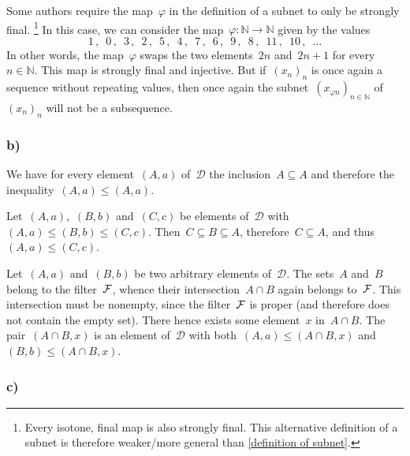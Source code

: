 \begin{itemize*}[resume*]

	\item
		Some authors require the map~$φ$ in the definition of a subnet to only be strongly final.%
		\footnote{
			Every isotone, final map is also strongly final.
			This alternative definition of a subnet is therefore weaker/more general than \cref{definition of subnet}.
		}
		In this case, we can consider the map~$φ \colon ℕ \to ℕ$ given by the values
		\[
			1 \,, \enspace 0 \,, \enspace
			3 \,, \enspace 2 \,, \enspace
			5 \,, \enspace 4 \,, \enspace
			7 \,, \enspace 6 \,, \enspace
			9 \,, \enspace 8 \,, \enspace
			11 \,, \enspace 10 \,, \enspace
			\dotsc
		\]
		In other words, the map~$φ$ swaps the two elements~$2n$ and~$2n + 1$ for every~$n ∈ ℕ$.
		This map is strongly final and injective.
		But if~$(x_n)_n$ is once again a sequence without repeating values, then once again the subnet~$(x_{φ n})_{n ∈ ℕ}$ of~$(x_n)_n$ will not be a subsequence.

\end{itemize*}



\subsubsection{b)}

We have for every element~$(A, a)$ of~$\mathcal{D}$ the inclusion~$A ⊆ A$ and therefore the inequality~$(A, a) ≤ (A, a)$.

Let~$(A, a)$,~$(B, b)$ and~$(C, c)$ be elements of~$\mathcal{D}$ with~$(A, a) ≤ (B, b) ≤ (C, c)$.
Then~$C ⊆ B ⊆ A$, therefore~$C ⊆ A$, and thus~$(A, a) ≤ (C, c)$.

Let~$(A, a)$ and~$(B, b)$ be two arbitrary elements of~$\mathcal{D}$.
The sets~$A$ and~$B$ belong to the filter~$\mathcal{F}$, whence their intersection~$A ∩ B$ again belongs to~$\mathcal{F}$.
This intersection must be nonempty, since the filter~$\mathcal{F}$ is proper (and therefore does not contain the empty set).
There hence exists some element~$x$ in~$A ∩ B$.
The pair~$(A ∩ B, x)$ is an element of~$\mathcal{D}$ with both~$(A, a) ≤ (A ∩ B, x)$ and~$(B, b) ≤ (A ∩ B, x)$.



\subsubsection{c)}


